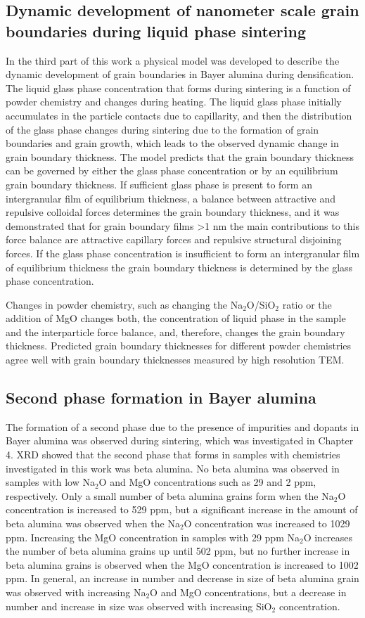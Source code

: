 \subsection{Dynamic development of nanometer scale grain boundaries during liquid phase sintering}
In the third part of this work a physical model was developed to describe the dynamic development of grain boundaries in Bayer alumina during densification. The liquid glass phase concentration that forms during sintering is a function of powder chemistry and changes during heating. The liquid glass phase initially accumulates in the particle contacts due to capillarity, and then the distribution of the glass phase changes during sintering due to the formation of grain boundaries and grain growth, which leads to the observed dynamic change in grain boundary thickness. The model predicts that the grain boundary thickness can be governed by either the glass phase concentration or by an equilibrium grain boundary thickness. If sufficient glass phase is present to form an intergranular film of equilibrium thickness, a balance between attractive and repulsive colloidal forces determines the grain boundary thickness, and it was demonstrated that for grain boundary films >1 nm the main contributions to this force balance are attractive capillary forces and repulsive structural disjoining forces. If the glass phase concentration is insufficient to form an intergranular film of equilibrium thickness the grain boundary thickness is determined by the glass phase concentration. 

Changes in powder chemistry, such as changing the Na$_{2}$O/SiO$_{2}$ ratio or the addition of MgO changes both, the concentration of liquid phase in the sample and the interparticle force balance, and, therefore, changes the grain boundary thickness. Predicted grain boundary thicknesses for different powder chemistries agree well with grain boundary thicknesses measured by high resolution TEM.  

\subsection{Second phase formation in Bayer alumina}
The formation of a second phase due to the presence of impurities and dopants in Bayer alumina was observed during sintering, which was investigated in Chapter 4. XRD showed that the second phase that forms in samples with chemistries investigated in this work was beta alumina. No beta alumina was observed in samples with low Na$_{2}$O and MgO concentrations such as 29 and 2 ppm, respectively. Only a small number of beta alumina grains form when the Na$_{2}$O concentration is increased to 529 ppm, but a significant increase in the amount of beta alumina was observed when the Na$_{2}$O concentration was increased to 1029 ppm. Increasing the MgO concentration in samples with 29 ppm Na$_{2}$O increases the number of beta alumina grains up until 502 ppm, but no further increase in beta alumina grains is observed when the MgO concentration is increased to 1002 ppm. In general, an increase in number and decrease in size of beta alumina grain was observed with increasing Na$_{2}$O and MgO concentrations, but a decrease in number and increase in size was observed with increasing SiO$_{2}$ concentration. 

